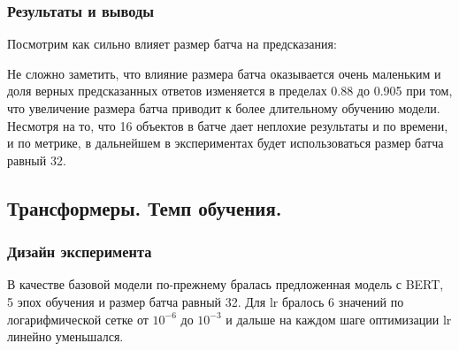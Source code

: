\documentclass{article}
\begin{document}
\subsubsection{Результаты и выводы}
Посмотрим как сильно влияет размер батча на предсказания:
\begin{figure}[h]
	\caption{\centering}
	\label{eq:batch}
\end{figure}
Не сложно заметить, что влияние размера батча оказывается очень маленьким и доля верных предсказанных ответов изменяется в пределах 0.88 до 0.905 при том, что увеличение размера батча приводит к более длительному обучению модели. Несмотря на то, что 16 объектов в батче дает неплохие результаты и по времени, и по метрике, в дальнейшем в экспериментах будет использоваться размер батча равный 32. 

\subsection{Трансформеры. Темп обучения.}
\subsubsection{Дизайн эксперимента}
В качестве базовой модели по-прежнему бралась предложенная модель с BERT, 5 эпох обучения и размер батча равный 32. Для lr бралось 6 значений по логарифмической сетке от $10^{-6}$ до $10^{-3}$ и дальше на каждом шаге оптимизации lr линейно уменьшался. 
\end{document}
